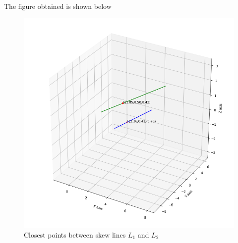 \documentclass[journal,12pt,twocolumn]{IEEEtran}
\begin{document}
\\
The figure obtained is shown below
\renewcommand{\thefigure}{1}
\begin{figure}[h!]
    \centering
    \includegraphics[width=\columnwidth]{closest.png}
    \caption{Closest points between skew lines $L_1$ and $L_2$}
    \label{myfig}
\end{figure}
\end{document}
